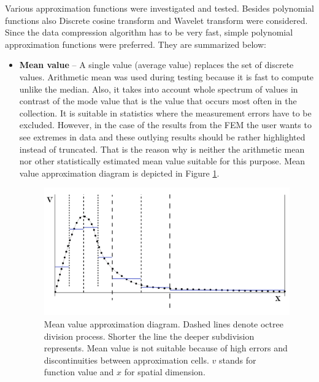 Various approximation functions were investigated and tested. Besides polynomial functions also Discrete cosine transform \cite{Roma2011} and Wavelet transform \cite{Li2014} were considered. Since the data compression algorithm has to be very fast, simple polynomial approximation functions were preferred. They are summarized below:

\begin{itemize}
  \item \textbf{Mean value} -- A single value (average value) replaces the set of discrete values. Arithmetic mean was used during testing because it is fast to compute unlike the median. Also, it takes into account whole spectrum of values in contrast of the mode value that is the value that occurs most often in the collection. It is suitable in statistics where the measurement errors have to be excluded. However, in the case of the results from the FEM the user wants to see extremes in data and these outlying results should be rather highlighted instead of truncated. That is the reason why is neither the arithmetic mean nor other statistically estimated mean value suitable for this purpose. Mean value approximation diagram is depicted in Figure \ref{fig:mean-value-approx}.

  \begin{figure}[H]
  \centering
  \includegraphics[width=\textwidth]{figures/chapter-approximation/figure4}
  \decoRule
  \caption[Mean value approximation diagram]{Mean value approximation diagram. Dashed lines denote octree division process. Shorter the line the deeper subdivision represents. Mean value is not suitable because of high errors and discontinuities between approximation cells. $v$ stands for function value and $x$ for spatial dimension.}
  \label{fig:mean-value-approx}
  \end{figure}


\end{itemize}
